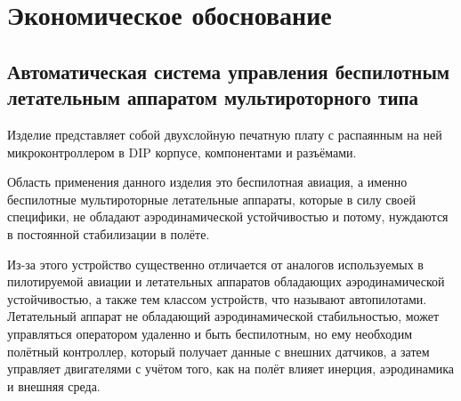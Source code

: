 \section{Экономическое обоснование}








\subsection{Автоматическая система управления 
  беспилотным летательным аппаратом
мультироторного типа}

Изделие представляет собой двухслойную печатную плату с распаянным на
ней микроконтроллером в DIP корпусе, компонентами и
разъёмами.

Область применения данного изделия это беспилотная авиация, а именно
беспилотные мультироторные летательные аппараты, которые в силу своей
специфики, не обладают аэродинамической устойчивостью и потому,
нуждаются в постоянной стабилизации в полёте.

Из-за этого устройство существенно отличается от аналогов
используемых в пилотируемой авиации и летательных аппаратов обладающих
аэродинамической устойчивостью, а также тем классом устройств, что называют
автопилотами. Летательный аппарат не обладающий аэродинамической
стабильностью, может управляться оператором удаленно и быть
беспилотным, но ему необходим полётный контроллер, который получает
данные с внешних датчиков, а затем управляет двигателями с учётом
того, как на полёт влияет инерция, аэродинамика и внешняя среда.

